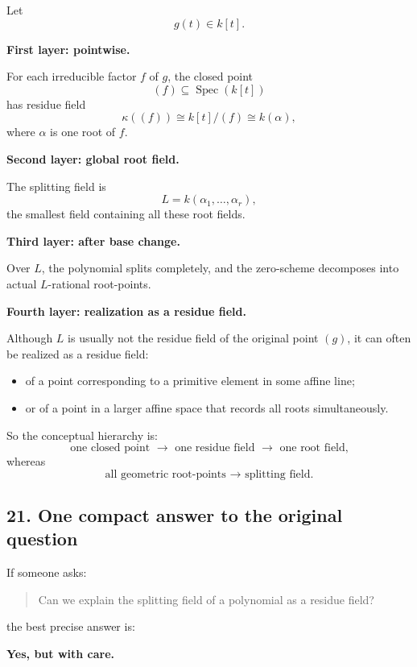 \documentclass[12pt,a4paper]{article}
\theoremstyle{plain}
\theoremstyle{definition}      %
\begin{document}
Let
\[
g(t)\in k[t].
\]

\textbf{First layer: pointwise.}

For each irreducible factor \(f\) of \(g\), the closed point
\[
(f)\subseteq \operatorname{Spec}(k[t])
\]
has residue field
\[
\kappa((f))\cong k[t]/(f)\cong k(\alpha),
\]
where \(\alpha\) is one root of \(f\).

\medskip

\textbf{Second layer: global root field.}

The splitting field is
\[
L=k(\alpha_1,\dots,\alpha_r),
\]
the smallest field containing all these root fields.

\medskip

\textbf{Third layer: after base change.}

Over \(L\), the polynomial splits completely, and the zero-scheme decomposes into actual \(L\)-rational root-points.

\medskip

\textbf{Fourth layer: realization as a residue field.}

Although \(L\) is usually not the residue field of the original point \((g)\), it can often be realized as a residue field:
\begin{itemize}
	\item of a point corresponding to a primitive element in some affine line;
	\item or of a point in a larger affine space that records all roots simultaneously.
\end{itemize}

So the conceptual hierarchy is:
\[
\text{one closed point } \longrightarrow \text{ one residue field } \longrightarrow \text{ one root field,}
\]
whereas
\[
\text{all geometric root-points } \longrightarrow \text{ splitting field.}
\]

\subsection*{21. One compact answer to the original question}

If someone asks:

\begin{quote}
	Can we explain the splitting field of a polynomial as a residue field?
\end{quote}

the best precise answer is:

\medskip

\textbf{Yes, but with care.}
\end{document}
